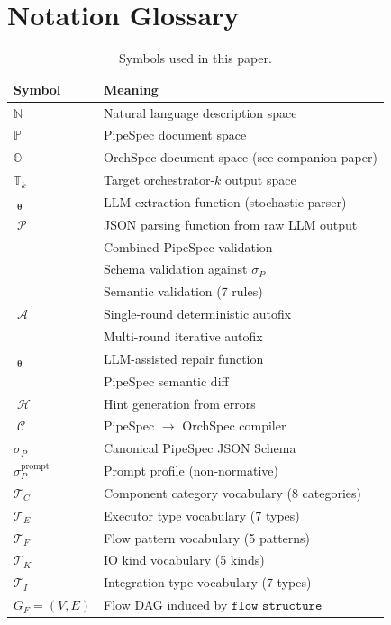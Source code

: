 \documentclass[11pt,a4paper]{article}
\theoremstyle{definition}
\DeclareMathOperator{\ExtractLLM}{\mathcal{E}_{\bm\theta}}
\DeclareMathOperator{\ParseLLM}{\mathcal{P}}
\DeclareMathOperator{\ValidateP}{\mathcal{V}_P}
\DeclareMathOperator{\ValidateSchemaP}{\mathcal{V}_S}
\DeclareMathOperator{\ValidateSemanticP}{\mathcal{V}_\Sigma}
\DeclareMathOperator{\Autofix}{\mathcal{A}}
\DeclareMathOperator{\AutofixMulti}{\mathcal{A}^*}
\DeclareMathOperator{\RepairLLM}{\mathcal{R}_{\bm\theta}}
\DeclareMathOperator{\DiffP}{\Delta_P}
\DeclareMathOperator{\Hints}{\mathcal{H}}
\DeclareMathOperator{\Compile}{\mathcal{C}}
\newcommand{\nspace}{\mathbb{N}}
\newcommand{\pspace}{\mathbb{P}}
\newcommand{\ospace}{\mathbb{O}}
\newcommand{\tspacek}{\mathbb{T}_k}
\begin{document}
\appendix
\section{Notation Glossary}

\begin{table}[htbp]
\centering
\caption{Symbols used in this paper.}
\begin{tabular}{@{}ll@{}}
\toprule
\textbf{Symbol} & \textbf{Meaning} \\
\midrule
$\nspace$          & Natural language description space \\
$\pspace$          & PipeSpec document space \\
$\ospace$          & OrchSpec document space (see companion paper) \\
$\tspacek$         & Target orchestrator-$k$ output space \\
$\ExtractLLM_{\bm\theta}$ & LLM extraction function (stochastic parser) \\
$\ParseLLM$        & JSON parsing function from raw LLM output \\
$\ValidateP$       & Combined PipeSpec validation \\
$\ValidateSchemaP$ & Schema validation against $\sigma_P$ \\
$\ValidateSemanticP$ & Semantic validation (7 rules) \\
$\Autofix$         & Single-round deterministic autofix \\
$\AutofixMulti$    & Multi-round iterative autofix \\
$\RepairLLM_{\bm\theta}$ & LLM-assisted repair function \\
$\DiffP$           & PipeSpec semantic diff \\
$\Hints$           & Hint generation from errors \\
$\Compile$         & PipeSpec $\to$ OrchSpec compiler \\
$\sigma_P$         & Canonical PipeSpec JSON Schema \\
$\sigma_P^{\text{prompt}}$ & Prompt profile (non-normative) \\
$\mathcal{T}_C$    & Component category vocabulary (8 categories) \\
$\mathcal{T}_E$    & Executor type vocabulary (7 types) \\
$\mathcal{T}_F$    & Flow pattern vocabulary (5 patterns) \\
$\mathcal{T}_K$    & IO kind vocabulary (5 kinds) \\
$\mathcal{T}_I$    & Integration type vocabulary (7 types) \\
$G_F = (V, E)$    & Flow DAG induced by $\texttt{flow\_structure}$ \\
\bottomrule
\end{tabular}
\end{table}
\end{document}
